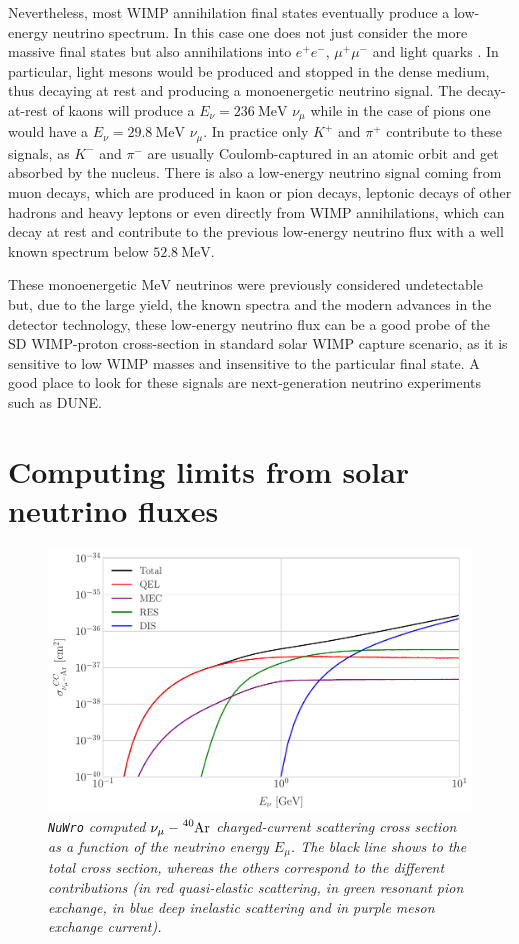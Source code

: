 Nevertheless, most WIMP annihilation final states eventually produce a low-energy neutrino spectrum.  In this case one does not just consider the more massive final states but also annihilations into $e^{+}e^{-}$, $\mu^{+}\mu^{-}$ and light quarks \cite{Bernal2012}. In particular, light mesons would be produced and stopped in the dense medium, thus decaying at rest and producing a monoenergetic neutrino signal. The decay-at-rest of kaons will produce a $E_{\nu} = 236 \ \mathrm{MeV}$ $\nu_{\mu}$ while in the case of pions one would have a $E_{\nu}  = 29.8 \ \mathrm{MeV}$ $\nu_{\mu}$. In practice only $K^{+}$ and $\pi^{+}$ contribute to these signals, as $K^{-}$ and $\pi^{-}$ are usually Coulomb-captured in an atomic orbit and get absorbed by the nucleus. There is also a low-energy neutrino signal coming from muon decays, which are produced in kaon or pion decays, leptonic decays of other hadrons and heavy leptons or even directly from WIMP annihilations, which can decay at rest and contribute to the previous low-energy neutrino flux with a well known spectrum below $52.8 \ \mathrm{MeV}$.

These monoenergetic $\mathrm{MeV}$ neutrinos were previously considered undetectable but, due to the large yield, the known spectra and the modern advances in the detector technology, these low-energy neutrino flux can be a good probe of the SD WIMP-proton cross-section in standard solar WIMP capture scenario, as it is sensitive to low WIMP masses and insensitive to the particular final state. A good place to look for these signals are next-generation neutrino experiments such as DUNE.

\section{Computing limits from solar neutrino fluxes}

\begin{figure}[t]
	\centering
	\includegraphics[width=0.9\linewidth]{Images/DM_Analysis/nu_Ar_xsection}
	\caption{\textit{\texttt{NuWro} computed $\nu_{\mu}-\ce{^{40}Ar}$ charged-current scattering cross section as a function of the neutrino energy $E_{\mu}$. The black line shows to the total cross section, whereas the others correspond to the different contributions (in red quasi-elastic scattering, in green resonant pion exchange, in blue deep inelastic scattering and in purple meson exchange current).}}
	\label{fig:nu_Ar_xsection}
\end{figure}

